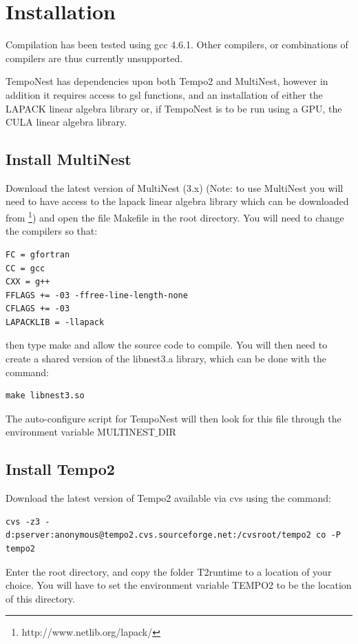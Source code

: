 \documentclass[%
 preprint,
 amsmath,amssymb,amsfonts,
 aps,
]{revtex4-1}
\begin{document}
\section{Installation}
\label{Section:Install}
Compilation has been tested using gcc 4.6.1.  Other compilers, or combinations of compilers are thus currently unsupported.

TempoNest has dependencies upon both Tempo2 and MultiNest, however in addition it requires access to gsl functions, and an installation of either the LAPACK linear algebra library or, if TempoNest is to be run using a GPU, the CULA linear algebra library.

\subsection{Install MultiNest}
Download the latest version of MultiNest (3.x) (Note: to use MultiNest you will need to have access to the lapack linear algebra library which can be downloaded from \footnote{http://www.netlib.org/lapack/})  and open the file Makefile in the root directory.    You will need to change the compilers so that:
%

\begin{lstlisting}
FC = gfortran
CC = gcc
CXX = g++
FFLAGS += -03 -ffree-line-length-none
CFLAGS += -03
LAPACKLIB = -llapack

\end{lstlisting}


%
then type make and allow the source code to compile.  You will then need to create a shared version of the libnest3.a library, which can be done with the command:
\begin{lstlisting}
make libnest3.so
\end{lstlisting}
 The auto-configure script for TempoNest will then look for this file through the environment variable MULTINEST$\_$DIR

\subsection{Install Tempo2}

Download the latest version of Tempo2 available via cvs using the command:
\begin{lstlisting}
cvs -z3 -d:pserver:anonymous@tempo2.cvs.sourceforge.net:/cvsroot/tempo2 co -P tempo2
\end{lstlisting}


Enter the root directory, and copy the folder T2runtime to a location of your choice.  You will have to set the environment variable TEMPO2 to be the location of this directory.
\end{document}
